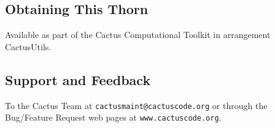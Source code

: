 \subsection{Obtaining This Thorn}

Available as part of the Cactus Computational Toolkit in arrangement
CactusUtils.

\subsection{Support and Feedback}

To the Cactus Team at {\tt cactusmaint@cactuscode.org} or through the 
Bug/Feature Request web pages at {\tt www.cactuscode.org}.



